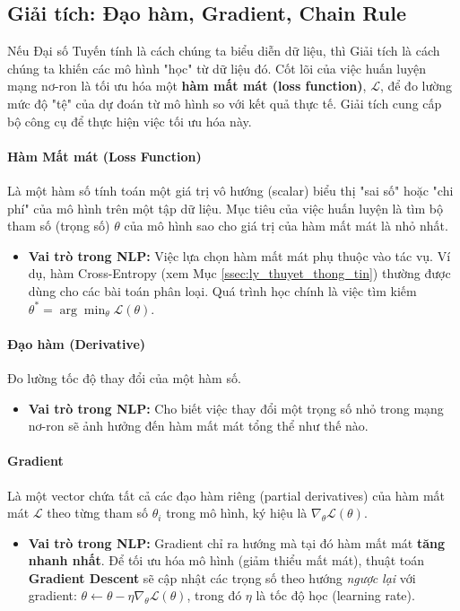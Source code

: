 \subsection{Giải tích: Đạo hàm, Gradient, Chain Rule}
\label{ssec:giai_tich}
Nếu Đại số Tuyến tính là cách chúng ta biểu diễn dữ liệu, thì Giải tích là cách chúng ta khiến các mô hình "học" từ dữ liệu đó. Cốt lõi của việc huấn luyện mạng nơ-ron là tối ưu hóa một \textbf{hàm mất mát (loss function)}, $\mathcal{L}$, để đo lường mức độ "tệ" của dự đoán từ mô hình so với kết quả thực tế. Giải tích cung cấp bộ công cụ để thực hiện việc tối ưu hóa này.

\paragraph{Hàm Mất mát (Loss Function)}
Là một hàm số tính toán một giá trị vô hướng (scalar) biểu thị "sai số" hoặc "chi phí" của mô hình trên một tập dữ liệu. Mục tiêu của việc huấn luyện là tìm bộ tham số (trọng số) $\theta$ của mô hình sao cho giá trị của hàm mất mát là nhỏ nhất.
\begin{itemize}
    \item \textbf{Vai trò trong NLP:} Việc lựa chọn hàm mất mát phụ thuộc vào tác vụ. Ví dụ, hàm Cross-Entropy (xem Mục \ref{ssec:ly_thuyet_thong_tin}) thường được dùng cho các bài toán phân loại. Quá trình học chính là việc tìm kiếm $\theta^* = \arg\min_{\theta} \mathcal{L}(\theta)$.
\end{itemize}

\paragraph{Đạo hàm (Derivative)}
Đo lường tốc độ thay đổi của một hàm số.
\begin{itemize}
    \item \textbf{Vai trò trong NLP:} Cho biết việc thay đổi một trọng số nhỏ trong mạng nơ-ron sẽ ảnh hưởng đến hàm mất mát tổng thể như thế nào.
\end{itemize}

\paragraph{Gradient}
Là một vector chứa tất cả các đạo hàm riêng (partial derivatives) của hàm mất mát $\mathcal{L}$ theo từng tham số $\theta_i$ trong mô hình, ký hiệu là $\nabla_{\theta}\mathcal{L}(\theta)$.
\begin{itemize}
    \item \textbf{Vai trò trong NLP:} Gradient chỉ ra hướng mà tại đó hàm mất mát \textbf{tăng nhanh nhất}. Để tối ưu hóa mô hình (giảm thiểu mất mát), thuật toán \textbf{Gradient Descent} sẽ cập nhật các trọng số theo hướng \textit{ngược lại} với gradient: $\theta \leftarrow \theta - \eta \nabla_{\theta}\mathcal{L}(\theta)$, trong đó $\eta$ là tốc độ học (learning rate).
\end{itemize}

